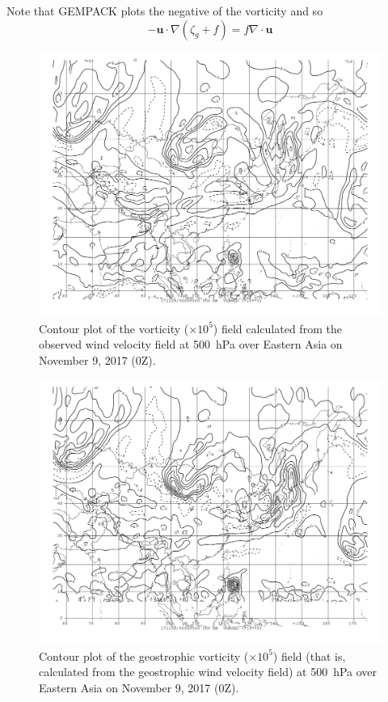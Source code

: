 \documentclass[11pt]{article}
\begin{document}
Note that GEMPACK plots the negative of the vorticity and so
\begin{equation*}
	- \bm{u} \cdot \nabla (\zeta_g + f) = f \nabla \cdot \bm{u}
\end{equation*}

\begin{figure}[h!]
	\centering
	\includegraphics[width=\textwidth]{vorwnd_obs_500hPa_China}
	\caption{Contour plot of the vorticity ($\times 10^5$) field calculated from the observed wind velocity field at \SI{500}{\hecto\Pa} over Eastern Asia on November 9, 2017 (0Z).}
	\label{fig:vorwnd_obs_500hPa_China}
\end{figure}

\begin{figure}[h!]
	\centering
	\includegraphics[width=\textwidth]{vorgeo_500hPa_China}
	\caption{Contour plot of the geostrophic vorticity ($\times 10^5$) field (that is, calculated from the geostrophic wind velocity field) at \SI{500}{\hecto\Pa} over Eastern Asia on November 9, 2017 (0Z).}
	\label{fig:vorgeo_obs_500hPa_China}
\end{figure}
\end{document}
